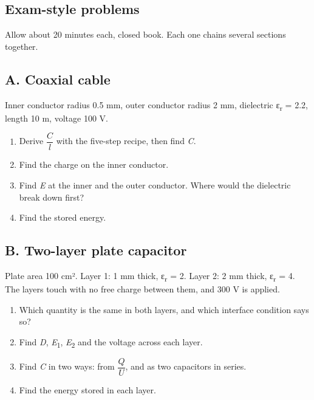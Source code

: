 \documentclass[11pt]{article}
\begin{document}
\begin{keepsection}
\section{Exam-style problems}

Allow about 20 minutes each, closed book. Each one chains several sections together.

\begin{keepsection}
\subsection{A. Coaxial cable}

Inner conductor radius 0.5 mm, outer conductor radius 2 mm, dielectric ε\textsubscript{r} = 2.2, length 10 m, voltage 100 V.

\begin{enumerate}
\item Derive {\small\ensuremath{\dfrac{{C}}{{l}}}} with the five-step recipe, then find \textit{C}.
\item Find the charge on the inner conductor.
\item Find \textit{E} at the inner and the outer conductor. Where would the dielectric break down first?
\item Find the stored energy.
\end{enumerate}

\end{keepsection}

\begin{keepsection}
\subsection{B. Two-layer plate capacitor}

Plate area 100 cm². Layer 1: 1 mm thick, ε\textsubscript{r} = 2. Layer 2: 2 mm thick, ε\textsubscript{r} = 4. The layers touch with no free charge between them, and 300 V is applied.

\begin{enumerate}
\item Which quantity is the same in both layers, and which interface condition says so?
\item Find \textit{D}, \textit{E}\textsubscript{1}, \textit{E}\textsubscript{2} and the voltage across each layer.
\item Find \textit{C} in two ways: from {\small\ensuremath{\dfrac{{Q}}{{U}}}}, and as two capacitors in series.
\item Find the energy stored in each layer.
\end{enumerate}

\end{keepsection}
\end{keepsection}
\end{document}
